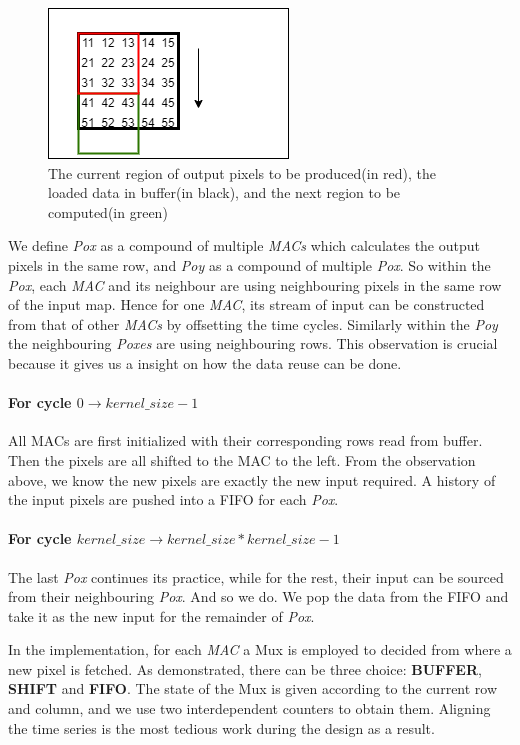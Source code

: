 \begin{figure}
    \centering
    \includegraphics[width=0.8\columnwidth]{figures/task.png}
    \caption{The current region of output pixels to be produced(in red), the loaded data in buffer(in black), and the next region to be computed(in green)}
\end{figure}


We define \textit{Pox} as a compound of multiple \textit{MACs} which calculates the output pixels in the same row, and \textit{Poy} as a compound of multiple \textit{Pox}. So within the \textit{Pox}, each \textit{MAC} and its neighbour are using neighbouring pixels in the same row of the input map. Hence for one \textit{MAC}, its stream of input can be constructed from that of other \textit{MACs} by offsetting the time cycles. Similarly within the \textit{Poy} the neighbouring \textit{Poxes} are using neighbouring rows. This observation is crucial because it gives us a insight on how the data reuse can be done.

\paragraph{ For cycle $0 \to kernel\_size-1$} All MACs are first initialized with their corresponding rows read from buffer. Then the pixels are all shifted to the MAC to the left. From the observation above, we know the new pixels are exactly the new input required. A history of the input pixels are pushed into a FIFO for each \textit{Pox}.
\paragraph{ For cycle $kernel\_size \to kernel\_size * kernel\_size - 1$} The last \textit{Pox} continues its practice, while for the rest, their input can be sourced from their neighbouring \textit{Pox}. And so we do. We pop the data from the FIFO and take it as the new input for the remainder of \textit{Pox}.


In the implementation, for each \textit{MAC} a Mux is employed to decided from where a new pixel is fetched. As demonstrated, there can be three choice: \textbf{BUFFER}, \textbf{SHIFT} and \textbf{FIFO}. The state of the Mux is given according to the current row and column, and we use two interdependent counters to obtain them. Aligning the time series is the most tedious work during the design as a result.